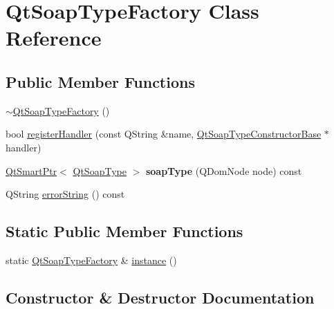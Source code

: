 \hypertarget{class_qt_soap_type_factory}{}\section{Qt\+Soap\+Type\+Factory Class Reference}
\label{class_qt_soap_type_factory}
\subsection*{Public Member Functions}
\begin{DoxyCompactItemize}
\item 
\mbox{\hyperlink{class_qt_soap_type_factory_ab5939f630e97cd1be863e419ed8a2b00}{$\sim$\+Qt\+Soap\+Type\+Factory}} ()
\item 
bool \mbox{\hyperlink{class_qt_soap_type_factory_a40b4ca8b260a678da380349a20b1c669}{register\+Handler}} (const Q\+String \&name, \mbox{\hyperlink{class_qt_soap_type_constructor_base}{Qt\+Soap\+Type\+Constructor\+Base}} $\ast$handler)
\item 
\mbox{\label{class_qt_soap_type_factory_ab95b0cb7f0fdef8425e20f1f6213f75a}} 
\mbox{\hyperlink{class_qt_smart_ptr}{Qt\+Smart\+Ptr}}$<$ \mbox{\hyperlink{class_qt_soap_type}{Qt\+Soap\+Type}} $>$ {\bfseries soap\+Type} (Q\+Dom\+Node node) const
\item 
Q\+String \mbox{\hyperlink{class_qt_soap_type_factory_a95e46dc6e31a67ac8dc5a13607b0bce6}{error\+String}} () const
\end{DoxyCompactItemize}
\subsection*{Static Public Member Functions}
\begin{DoxyCompactItemize}
\item 
static \mbox{\hyperlink{class_qt_soap_type_factory}{Qt\+Soap\+Type\+Factory}} \& \mbox{\hyperlink{class_qt_soap_type_factory_a193edc044465683f13bef6193fb9d33e}{instance}} ()
\end{DoxyCompactItemize}


\subsection{Constructor \& Destructor Documentation}
\mbox{\label{class_qt_soap_type_factory_ab5939f630e97cd1be863e419ed8a2b00}} 
